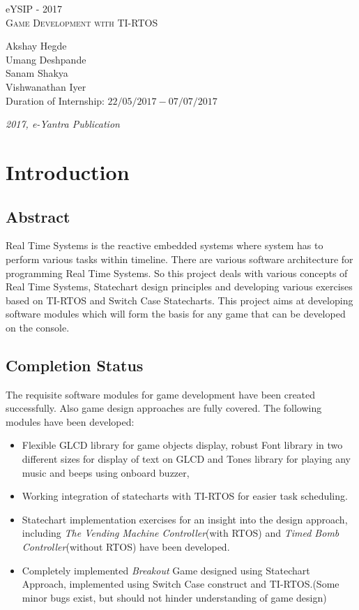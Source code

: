 \documentclass[a4paper,12pt,oneside]{book}
\begin{document}
\begin{titlepage}
\raggedright
{\Large eYSIP - 2017\\[1cm]}
{\Huge\scshape Game Development with TI-RTOS \\[.1in]}
\vfill
\begin{flushright}
{\large Akshay Hegde \\}
{\large Umang Deshpande \\}
{\large Sanam Shakya \\}
{\large Vishwanathan Iyer \\}
{\large Duration of Internship: $ 22/05/2017-07/07/2017 $ \\}
\end{flushright}

{\itshape 2017, e-Yantra Publication}
\end{titlepage}
\tableofcontents

\chapter{Introduction}
\section*{Abstract}
\qquad Real Time Systems is the reactive embedded systems where system has to perform various tasks within timeline. There are various software architecture for programming Real Time Systems. So this project deals with various concepts of Real Time Systems, Statechart design principles and developing various exercises based on TI-RTOS and Switch Case Statecharts. This project aims at developing software modules which will form the basis for any game that can be developed on the console.

\section*{Completion Status}
\qquad The requisite software modules for game development have been created successfully. Also game design approaches are fully covered. The following modules have been developed:
\begin{itemize}
    \item Flexible GLCD library for game objects display, robust Font library in two different sizes for display of text on GLCD and Tones library for playing any music and beeps using onboard buzzer,
    \item Working integration of statecharts with TI-RTOS for easier task scheduling.
    \item Statechart implementation exercises for an insight into the design approach, including \textit{The Vending Machine Controller}(with RTOS) and \textit{Timed Bomb Controller}(without RTOS) have been developed.
    \item Completely implemented \textit{Breakout} Game designed using Statechart Approach, implemented using Switch Case construct and TI-RTOS.(Some minor bugs exist, but should not hinder understanding of game design)
\end{itemize}
\end{document}
